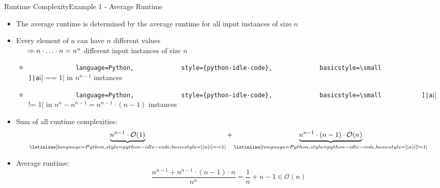 
\begin{frame}{Runtime Complexity}{Example 1 - Average Runtime}
  \begin{itemize}
    \item
      The {\color{Mittel-Blau}average runtime} is determined by the average
      runtime for all input instances of size $n$
    \item
      Every element of $a$ can have $n$ different values\\
      \begin{math}
        \hspace{1.5em}\Rightarrow n \cdot \ldots \cdot n = n^n
      \end{math}
      different input instances of size $n$
      \begin{itemize}
        \item
          \lstinline[
            language=Python,
            style={python-idle-code},
            basicstyle=\small
            ]|a[i] == 1|
          in $n^{n-1}$ instances
        \item
          \lstinline[
            language=Python,
            style={python-idle-code},
            basicstyle=\small
          ]|a[i] != 1|
          in $n^n - n^{n-1} = n^{n-1} \cdot (n-1)$ instances
      \end{itemize}
    \item
      Sum of all runtime complexities:
      \begin{displaymath}
        \underbrace{n^{n-1} \cdot \mathcal{O}(1)\vphantom{()}}_{
          \lstinline[
            language=Python,
            style={python-idle-code},
            basicstyle=\small
          ]|a[i] == 1|
        } + \underbrace{n^{n-1} \cdot (n-1) \cdot \mathcal{O}(n)}_{
          \lstinline[
            language=Python,
            style={python-idle-code},
            basicstyle=\small
          ]|a[i] != 1|
        }
      \end{displaymath}
    \item
      {\color{Mittel-Blau}Average runtime}:
      \begin{displaymath}
        \frac{n^{n-1} + n^{n-1} \cdot (n-1) \cdot n}{n^n}
        = \frac{1}{n} + n - 1
        \in \mathcal{O}(n)
      \end{displaymath}
  \end{itemize}
\end{frame}

